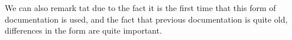 We can also remark tat due to the fact it is  the first time that this form of documentation is used, and the fact that previous documentation is quite old, differences in the form are quite important.   



